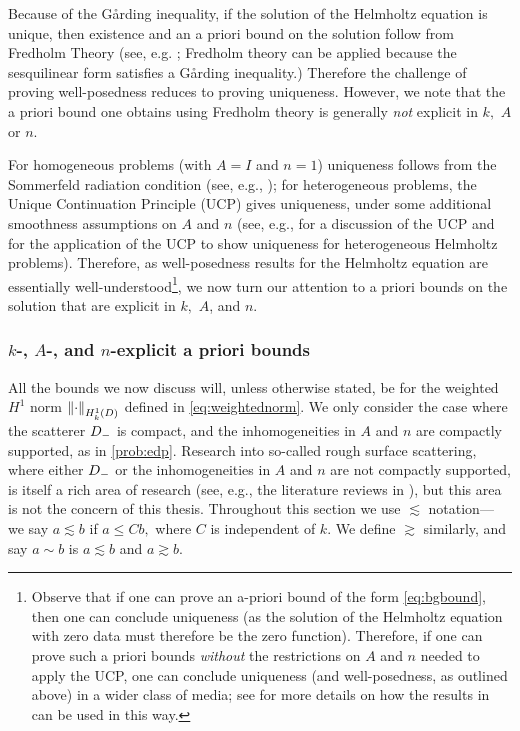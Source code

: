 Because of the G\r{a}rding inequality, if the solution of the Helmholtz equation is unique, then existence and an a priori bound on the solution follow from Fredholm Theory (see, e.g. \cite[Theorems 5.10 and 5.18]{Sp:15}; Fredholm theory can be applied because the sesquilinear form satisfies a G\r{a}rding inequality.) Therefore the challenge of proving well-posedness reduces to proving uniqueness. However, we note that the a priori bound one obtains using Fredholm theory is generally \emph{not} explicit in $k,$ $A$ or $n$.

For homogeneous problems (with $A=I$ and $n=1$) uniqueness follows from the Sommerfeld radiation condition (see, e.g., \cite[Corollary 2.9]{ChGrLaSp:12}); for heterogeneous problems, the Unique Continuation Principle (UCP) gives uniqueness, under some additional smoothness assumptions on $A$ and $n$ (see, e.g., \cite[p. 2871]{GrPeSp:19} for a discussion of the UCP and \cite[Section 2]{GrSa:18} for the application of the UCP to show uniqueness for heterogeneous Helmholtz problems). Therefore, as well-posedness results for the Helmholtz equation are essentially well-understood\footnote{Observe that if one can prove an a-priori bound of the form \eqref{eq:bgbound}, then one can conclude uniqueness (as the solution of the Helmholtz equation with zero data must therefore be the zero function). Therefore, if one can prove such a priori bounds \emph{without} the restrictions on $A$ and $n$ needed to apply the UCP, one can conclude uniqueness (and well-posedness, as outlined above) in a wider class of media; see \cite[pp. 2873, 2883]{GrPeSp:19} for more details on how the results in \cite{GrPeSp:19} can be used in this way.}, we now turn our attention to a priori bounds on the solution that are explicit in $k,$ $A$, and $n.$

\subsubsection{$k$-, $A$-, and $n$-explicit a priori bounds}
 All the bounds we now discuss will, unless otherwise stated, be for the weighted $H^1$ norm $\NHokD{\cdot}$ defined in \cref{eq:weightednorm}. We  only consider the case where the scatterer $D_{-}$ is compact, and the inhomogeneities in $A$ and $n$ are compactly supported, as in \cref{prob:edp}. Research into so-called rough surface scattering, where either $D_{-}$ or the inhomogeneities in $A$ and $n$ are not compactly supported, is itself a rich area of research (see, e.g., the literature reviews in \cite{Th:06}), but this area is not the concern of this thesis. Throughout this section we use $\lesssim$ notation--- we say $a \lesssim b$ if $a \leq C b,$ where $C$ is independent of $k$. We define $\gtrsim$ similarly, and say $a \sim b$ is $a \lesssim b$ and $a \gtrsim b.$

